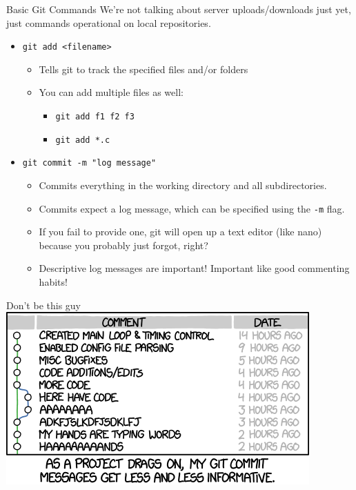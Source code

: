 \documentclass[11pt]{beamer}
\begin{document}
\begin{frame}{Basic Git Commands}
We're not talking about server uploads/downloads just yet, just commands operational on local repositories.
\begin{itemize}
\item \texttt{git add <filename>}
\begin{itemize}
\item Tells git to track the specified files and/or folders
\item You can add multiple files as well: 
\begin{itemize}
\item \texttt{git add f1 f2 f3}
\item \texttt{git add *.c}
\end{itemize}
\end{itemize}
\item \texttt{git commit -m "log message"}
\begin{itemize}
\item Commits everything in the working directory and all subdirectories.
\item Commits expect a log message, which can be specified using the \texttt{-m} flag.  
\item If you fail to provide one, git will open up a text editor (like nano) because you probably just forgot, right?
\item Descriptive log messages are important!  Important like good commenting habits!  
\end{itemize}
\end{itemize}
\end{frame}

\begin{frame}{Don't be this guy}
\center
\includegraphics[scale=0.6]{xkcd.png}
\end{frame}
\end{document}
